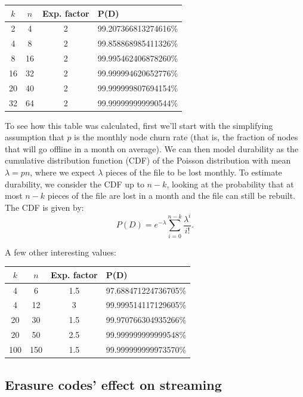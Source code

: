 \documentclass[11pt,fleqn,openany]{book}
\begin{document}
\begin{center}
\begin{tabular}{c c c l}
$k$ & $n$ & Exp. factor & P(D) \\ \hline
2 & 4 & 2 & 99.207366813274616\%\\
4 & 8 & 2 & 99.858868985411326\%\\
8 & 16 & 2 & 99.995462406878260\%\\
16 & 32 & 2 & 99.999994620652776\%\\
20 & 40 & 2 & 99.999999807694154\%\\
32 & 64 & 2 & 99.999999999990544\%\\
\end{tabular}
\end{center}

To see how this table was calculated, first we'll start
with the simplifying assumption that $p$ is the monthly node
churn rate (that is, the fraction of nodes that will go offline in a month on
average). We can then model durability
as the cumulative distribution function (CDF) of the Poisson distribution with mean $\lambda=pn$,
where we expect $\lambda$ pieces of the file to be lost monthly. To estimate
durability, we consider the CDF up to $n-k$,
looking at the probability that at most $n-k$ pieces
of the file are lost in a month and the file can still be rebuilt.
The CDF is given by:
\begin{equation}
P(D) = e^{-\lambda} \sum_{i=0}^{n-k} \frac{\lambda^i}{i!}.
\label{eq:poiss_cdf}
\end{equation}

A few other interesting values:

\begin{center}
\begin{tabular}{c c c l}
$k$ & $n$ & Exp. factor & P(D) \\ \hline
4 & 6 & 1.5 & 97.688471224736705\%\\
4 & 12 & 3 & 99.999514117129605\%\\
20 & 30 & 1.5 & 99.970766304935266\%\\
20 & 50 & 2.5 & 99.999999999999548\%\\
100 & 150 & 1.5 & 99.999999999973570\%\\
\end{tabular}
\end{center}

\subsection{Erasure codes' effect on streaming}
\end{document}
